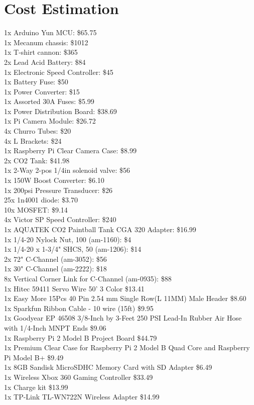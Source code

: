 \documentclass[letterpaper,12pt]{article}
\begin{document}
\section{Cost Estimation}

\label{sec:cost}
1x Arduino Yun MCU: \$65.75 \\
1x Mecanum chassis: \$1012 \\
1x T-shirt cannon: \$365 \\
2x Lead Acid Battery: \$84 \\
1x Electronic Speed Controller: \$45 \\
1x Battery Fuse: \$50 \\
1x Power Converter: \$15 \\
1x Assorted 30A Fuses: \$5.99 \\
1x Power Distribution Board: \$38.69 \\
1x Pi Camera Module: \$26.72 \\
4x Churro Tubes: \$20 \\
4x L Brackets: \$24 \\
1x Raspberry Pi Clear Camera Case: \$8.99 \\
2x CO2 Tank: \$41.98 \\
1x 2-Way 2-pos 1/4in solenoid valve: \$56 \\
1x 150W Boost Converter: \$6.10 \\
1x 200psi Pressure Transducer: \$26 \\
25x 1n4001 diode: \$3.70 \\
10x MOSFET: \$9.14 \\

4x Victor SP Speed Controller: \$240 \\
1x AQUATEK CO2 Paintball Tank CGA 320 Adapter: \$16.99 \\
1x 1/4-20 Nylock Nut, 100 (am-1160): \$4 \\
1x 1/4-20 x 1-3/4" SHCS, 50 (am-1206): \$14 \\
2x 72" C-Channel (am-3052): \$56 \\
1x 30" C-Channel (am-2222): \$18 \\
8x Vertical Corner Link for C-Channel (am-0935): \$88 \\
1x Hitec 59411 Servo Wire 50' 3 Color \$13.41 \\
1x Easy More 15Pcs 40 Pin 2.54 mm Single Row(L 11MM) Male Header \$8.60 \\
1x Sparkfun Ribbon Cable - 10 wire (15ft) \$9.95 \\
1x Goodyear EP 46508 3/8-Inch by 3-Feet 250 PSI Lead-In Rubber Air Hose with 1/4-Inch MNPT Ends \$9.06 \\
1x Raspberry Pi 2 Model B Project Board	\$44.79 \\
1x Premium Clear Case for Raspberry Pi 2 Model B Quad Core and Raspberry Pi Model B+ \$9.49 \\
1x 8GB Sandisk MicroSDHC Memory Card with SD Adapter	\$6.49 \\
1x Wireless Xbox 360 Gaming Controller \$33.49 \\
1x Charge kit \$13.99 \\
1x TP-Link TL-WN722N Wireless Adapter \$14.99 \\
\end{document}
